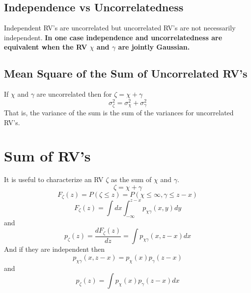 \documentclass{article}
\begin{document}
    \subsection{Independence vs Uncorrelatedness}
    Independent RV's are uncorrelated but uncorrelated RV's are not necessarily independent. \textbf{In one case independence 
    and uncorrelatedness are equivalent when the RV $\chi$ and $\gamma$ are jointly Gaussian.}

    \subsection{Mean Square of the Sum of Uncorrelated RV's}
    If $\chi$ and $\gamma$ are uncorrelated then for $\zeta = \chi + \gamma$
    \begin{equation}
        \sigma_{\zeta}^2 =  \sigma_{\chi}^2 +  \sigma_{\gamma}^2
    \end{equation}
    That is, the variance of the sum is the sum of the variances for uncorrelated RV's.

    \section{Sum of RV's}
    It is useful to characterize an RV $\zeta$ as the sum of $\chi$ and $\gamma$. 
    \begin{equation}
        \zeta = \chi + \gamma
    \end{equation}
    \begin{equation}
        F_{\zeta}(z) = P(\zeta \le z) = P(\chi \le \infty, \gamma \le z-x)
    \end{equation}
    \begin{equation}
        F_{\zeta}(z) = \int dx \int_{-\infty}^{z-x}p_{\chi\gamma}(x, y)dy
    \end{equation}
    and 
    \begin{equation}
        p_{\zeta}(z) = \frac{dF_{\zeta}(z)}{dz} = \int p_{\chi\gamma}(x, z-x)dx
    \end{equation}
    And if they are independent then 
    \begin{equation}
        p_{\chi\gamma}(x, z-x) = p_{\chi}(x)p_{\gamma}(z-x)
    \end{equation}
    and 
    \begin{equation}
        p_{\zeta}(z) = \int p_{\chi}(x)p_{\gamma}(z-x)dx
    \end{equation}
\end{document}
